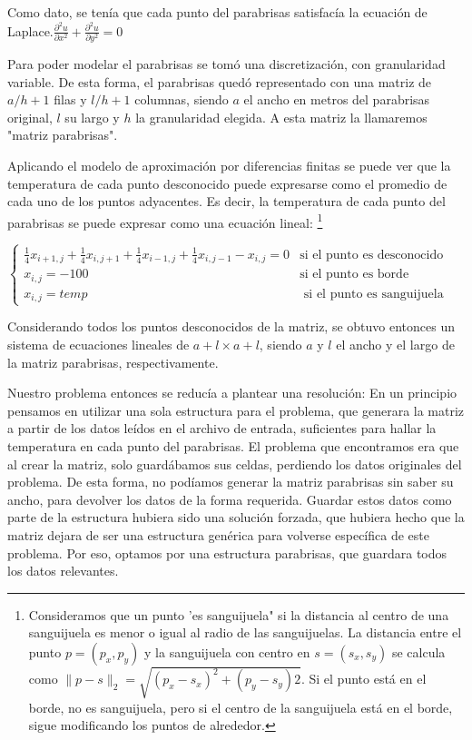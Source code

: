 \documentclass[spanish,a4paper]{article}
\begin{document}
Como dato, se tenía que cada punto del parabrisas satisfacía la ecuación de Laplace.\newline $\frac{\partial ^2u}{\partial x^2}+\frac{\partial ^2u}{\partial y^2}=0$

Para poder modelar el parabrisas se tomó una discretización, con granularidad variable. De esta forma, el parabrisas quedó representado con una matriz de $a/h+1$ filas y $l/h+1$ columnas, siendo $a$ el ancho en metros del parabrisas original, $l$ su largo y $h$ la granularidad elegida. A esta matriz la llamaremos "matriz parabrisas".

Aplicando el modelo de aproximación por diferencias finitas se puede ver que la temperatura de cada punto desconocido puede expresarse como el promedio de cada uno de los puntos adyacentes. Es decir, la temperatura de cada punto del parabrisas se puede expresar como una ecuación lineal: \footnote{Consideramos que un punto 'es sanguijuela" si la distancia al centro de una sanguijuela es menor o igual al radio de las sanguijuelas. La distancia entre el punto $p=(p_x, p_y)$ y la sanguijuela con centro en $s=(s_x, s_y)$ se calcula como $\| p-s  \|_{2}= \sqrt{(p_x-s_x)^2+(p_y-s_y)2}$. Si el punto está en el borde, no es sanguijuela, pero si el centro de la sanguijuela está en el borde, sigue modificando los puntos de alrededor.} \newline 

$\left \{\begin{array}{ll}
\frac{1}{4}x_{i+1,j}+\frac{1}{4}x_{i,j+1}+\frac{1}{4}x_{i-1,j}+\frac{1}{4}x_{i,j-1}-x_{i,j}=0 & \text{si el punto es desconocido} \\  x_{i,j}=-100 & \text{si el punto es borde} \\ x_{i,j}=temp & \text{ si el punto es sanguijuela} \end{array}$ \newline

Considerando todos los puntos desconocidos de la matriz, se obtuvo entonces un sistema de ecuaciones lineales de $a+l \times a+l$, siendo $a$ y $l$ el ancho y el largo de la matriz parabrisas, respectivamente.

Nuestro problema entonces se reducía a plantear una resolución:
En un principio pensamos en utilizar una sola estructura para el problema, que generara la matriz a partir de los datos leídos en el archivo de entrada, suficientes para hallar la temperatura en cada punto del parabrisas. El problema que encontramos era que al crear la matriz, solo guardábamos sus celdas, perdiendo los datos originales del problema. De esta forma, no podíamos generar la matriz parabrisas sin saber su ancho, para devolver los datos de la forma requerida. Guardar estos datos como parte de la estructura hubiera sido una solución forzada, que hubiera hecho que la matriz dejara de ser una estructura genérica para volverse específica de este problema. Por eso, optamos por una estructura parabrisas, que guardara todos los datos relevantes.
\end{document}

